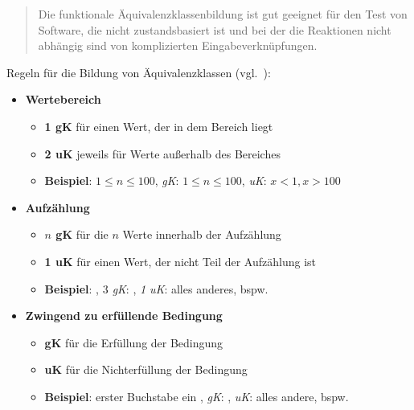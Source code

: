 \begin{tcolorbox}[title=Äquivalenzklassen]
    \noindent
    \blockquote[{\cite[58]{Bal97}}]{
        Die funktionale Äquivalenzklassenbildung ist gut geeignet für den Test von Software, die nicht zustandsbasiert ist und bei der die Reaktionen nicht abhängig sind von komplizierten Eingabeverknüpfungen.
    }
\end{tcolorbox}

\begin{tcolorbox}[title=Beispiel,colback=white]
    Regeln für die Bildung von Äquivalenzklassen (vgl.~\cite[52 ff.]{Lig09b}):
    \begin{itemize}
        \item[] \textbf{Wertebereich}
        \begin{itemize}
            \item \textbf{1 gK} für einen Wert, der in dem Bereich liegt
            \item \textbf{2 uK} jeweils für Werte außerhalb des Bereiches
            \item \textbf{Beispiel}: $1 \leq n  \leq 100$, \textit{gK}: $1 \leq n  \leq 100$, \textit{uK}: $x < 1, x > 100$
        \end{itemize}
        \item[] \textbf{Aufzählung}
        \begin{itemize}
            \item \textbf{$n$ gK} für die $n$ Werte innerhalb der Aufzählung
            \item \textbf{1 uK} für einen Wert, der nicht Teil der Aufzählung ist
            \item \textbf{Beispiel}: \code{[A, D, F]}, \textit{$3$ gK}: , \textit{1 uK}: alles anderes, bspw. 
        \end{itemize}
        \item[] \textbf{Zwingend zu erfüllende Bedingung}
        \begin{itemize}
            \item \textbf{gK} für die Erfüllung der Bedingung
            \item \textbf{uK} für die Nichterfüllung der Bedingung
            \item \textbf{Beispiel}: erster Buchstabe ein , \textit{gK}: , \textit{uK}: alles andere, bspw. 
        \end{itemize}
    \end{itemize}
\end{tcolorbox}